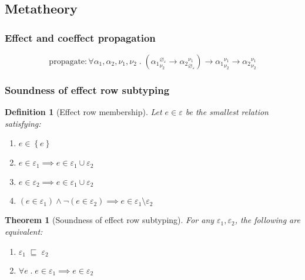 \documentclass[12pt]{article}
\newtheorem{definition}{Definition}
\newtheorem{theorem}{Theorem}
\newcommand\anno[2]{#1 : #2}
\newcommand\parens[1]{\left( #1 \right)}
\newcommand\tembellished[3]{{#1}^{#2}_{#3}}
\newcommand\tvar{\alpha}
\newcommand\tarrow[2]{#1 \rightarrow #2}
\newcommand\tforall[2]{\forall #1 \; . \; #2}
\newcommand\row{\varepsilon}
\newcommand\rvar{\nu}
\newcommand\rempty{\varnothing_{\row}}
\newcommand\rsingleton[1]{\left\{ #1 \right\}}
\newcommand\runion[2]{#1 \cup #2}
\newcommand\rdiff[2]{#1 \setminus #2}
\newcommand\effect{e}
\newcommand\contained[2]{#1 \; \sqsubseteq \; #2}
\begin{document}
    \subsection{Metatheory}

      \subsubsection{Effect and coeffect propagation}

        \[ \anno{\text{propagate}}{\tforall{\tvar_1, \tvar_2, \rvar_1, \rvar_2}{\tarrow{\parens{\tarrow{\tembellished{\tvar_1}{\rempty}{\rvar_2}}{\tembellished{\tvar_2}{\rvar_1}{\rempty}}}}{\tarrow{\tembellished{\tvar_1}{\rvar_1}{\rvar_2}}{\tembellished{\tvar_2}{\rvar_1}{\rvar_2}}}}} \]

      \subsubsection{Soundness of effect row subtyping}

        \begin{definition}[Effect row membership]
          Let $\effect \in \row$ be the smallest relation satisfying:
          \begin{enumerate}
            \item $\effect \in \rsingleton{\effect}$
            \item $\effect \in \row_1 \implies \effect \in \runion{\row_1}{\row_2}$
            \item $\effect \in \row_2 \implies \effect \in \runion{\row_1}{\row_2}$
            \item $\parens{\effect \in \row_1} \wedge \neg \parens{\effect \in \row_2} \implies \effect \in \rdiff{\row_1}{\row_2}$
          \end{enumerate}
        \end{definition}

        \begin{theorem}[Soundness of effect row subtyping]
          For any $\row_1, \row_2$, the following are equivalent:
          \begin{enumerate}
            \item $\contained{\row_1}{\row_2}$
            \item $\forall \effect \;.\; \effect \in \row_1 \implies \effect \in \row_2$
          \end{enumerate}
        \end{theorem}
\end{document}
